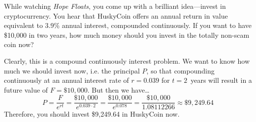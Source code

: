 \documentclass[12pt,letterpaper]{exam}
\begin{document}
\begin{questions}
\newpage
\question[10] While watching \textit{Hope Floats}, you come up with a brilliant idea---invest in cryptocurrency. You hear that HuskyCoin offers an annual return in value equivalent to 3.9\% annual interest, compounded continuously. If you want to have \$10,000 in two years, how much money should you invest in the totally non-scam coin now? \pspace

\sol Clearly, this is a compound continuously interest problem. We want to know how much we should invest now, i.e. the principal $P$, so that compounding continuously at an annual interest rate of $r= 0.039$ for $t= 2$~years will result in a future value of $F= \$10,\!000$. But then we have\dots
	\[
	P= \dfrac{F}{e^{rt}}= \dfrac{\$10,\!000}{e^{0.039 \cdot 2}}= \dfrac{\$10,\!000}{e^{0.078}}= \dfrac{\$10,\!000}{1.08112266} \approx \$9,\!249.64
	\]
Therefore, you should invest \$9,249.64 in HuskyCoin now. 


\end{questions}
\end{document}
